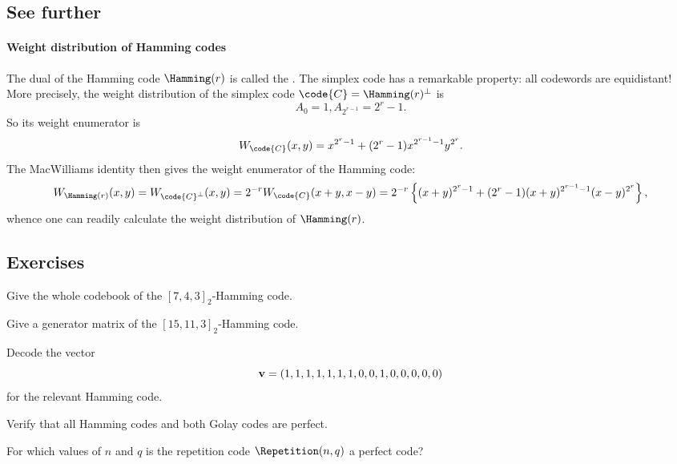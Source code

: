 \documentclass[a4paper, 11pt, openany]{book}
\begin{document}
\subsection{See further}

\paragraph{Weight  distribution of Hamming codes}
The dual of the Hamming code $\Hamming(r)$ is called the . The simplex code has a remarkable property: all codewords are equidistant! More precisely, the weight distribution of the simplex code $\code{C} = \Hamming(r)^\perp$ is
\[
    A_0 = 1, A_{2^{r-1}} = 2^r - 1.
\]
So its weight enumerator is
\[
    W_\code{C}(x,y) = x^{2^r - 1} + (2^r - 1) x^{2^{r-1} - 1} y^{2^r}.
\]
The MacWilliams identity then gives the weight enumerator of the Hamming code:
\[
    W_{\Hamming(r)}(x,y) = W_{\code{C}^\perp}(x,y) = 2^{-r} W_\code{C}(x+y, x-y) = 2^{-r} \left\{ (x + y)^{2^r - 1} + (2^r - 1) (x + y)^{2^{r-1} - 1} (x-y)^{2^r} \right\},
\]
whence one can readily calculate the weight distribution of $\Hamming(r)$.


\subsection{Exercises}


\begin{exercise}
Give the whole codebook of the $[7,4,3]_2$-Hamming code.
\end{exercise}

\begin{exercise}
Give a generator matrix of the $[15,11,3]_2$-Hamming code.
\end{exercise}

\begin{exercise}
Decode the vector
\[
    {\bf v} = (1,1,1,1,1,1,1,0,0,1,0,0,0,0,0)
\]
for the relevant Hamming code.
\end{exercise}

\begin{exercise}
Verify that all Hamming codes and both Golay codes are perfect.
\end{exercise}






\begin{exercise}
For which values of $n$ and $q$ is the repetition code $\Repetition(n,q)$ a perfect code?
\end{exercise}
\end{document}
